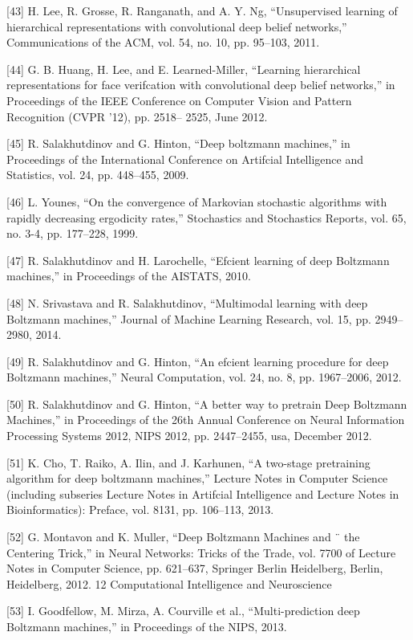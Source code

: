 \documentclass[a4paper]{article}
\begin{document}
[43] H. Lee, R. Grosse, R. Ranganath, and A. Y. Ng, “Unsupervised
learning of hierarchical representations with convolutional
deep belief networks,” Communications of the ACM, vol. 54, no.
10, pp. 95–103, 2011.


[44] G. B. Huang, H. Lee, and E. Learned-Miller, “Learning hierarchical representations for face verifcation with convolutional
deep belief networks,” in Proceedings of the IEEE Conference on
Computer Vision and Pattern Recognition (CVPR ’12), pp. 2518–
2525, June 2012.


[45] R. Salakhutdinov and G. Hinton, “Deep boltzmann machines,”
in Proceedings of the International Conference on Artifcial
Intelligence and Statistics, vol. 24, pp. 448–455, 2009.


[46] L. Younes, “On the convergence of Markovian stochastic algorithms with rapidly decreasing ergodicity rates,” Stochastics and
Stochastics Reports, vol. 65, no. 3-4, pp. 177–228, 1999.


[47] R. Salakhutdinov and H. Larochelle, “Efcient learning of deep
Boltzmann machines,” in Proceedings of the AISTATS, 2010.


[48] N. Srivastava and R. Salakhutdinov, “Multimodal learning
with deep Boltzmann machines,” Journal of Machine Learning
Research, vol. 15, pp. 2949–2980, 2014.


[49] R. Salakhutdinov and G. Hinton, “An efcient learning procedure for deep Boltzmann machines,” Neural Computation, vol.
24, no. 8, pp. 1967–2006, 2012.


[50] R. Salakhutdinov and G. Hinton, “A better way to pretrain Deep
Boltzmann Machines,” in Proceedings of the 26th Annual Conference on Neural Information Processing Systems 2012, NIPS 2012,
pp. 2447–2455, usa, December 2012.


[51] K. Cho, T. Raiko, A. Ilin, and J. Karhunen, “A two-stage pretraining algorithm for deep boltzmann machines,” Lecture Notes in
Computer Science (including subseries Lecture Notes in Artifcial
Intelligence and Lecture Notes in Bioinformatics): Preface, vol.
8131, pp. 106–113, 2013.


[52] G. Montavon and K. Muller, “Deep Boltzmann Machines and ¨
the Centering Trick,” in Neural Networks: Tricks of the Trade, vol.
7700 of Lecture Notes in Computer Science, pp. 621–637, Springer
Berlin Heidelberg, Berlin, Heidelberg, 2012.
12 Computational Intelligence and Neuroscience


	[53] I. Goodfellow, M. Mirza, A. Courville et al., “Multi-prediction
deep Boltzmann machines,” in Proceedings of the NIPS, 2013.
\end{document}
